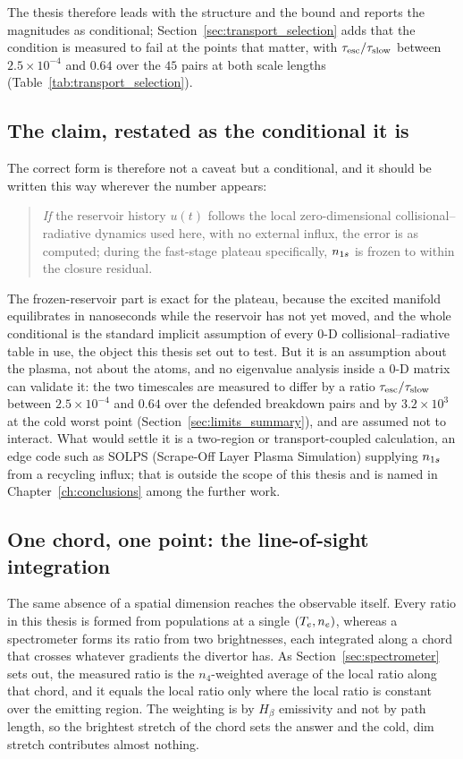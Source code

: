 The thesis therefore leads with the structure and the bound and reports the
magnitudes as conditional; Section~\ref{sec:transport_selection} adds that the
condition is measured to fail at the points that matter, with
$\tau_{\mathrm{esc}}/\tau_{\mathrm{slow}}$ between $2.5\times10^{-4}$ and $0.64$ over the $45$ pairs at
both scale lengths (Table~\ref{tab:transport_selection}).

\subsection{The claim, restated as the conditional it is}

The correct form is therefore not a caveat but a conditional, and it should be
written this way wherever the number appears:

\begin{quote}
\emph{If} the reservoir history $u(t)$ follows the local zero-dimensional
collisional--radiative dynamics used here, with no external influx, the error
is as computed; during the fast-stage plateau specifically, $n_{1s}$ is frozen to
within the closure residual.
\end{quote}

The frozen-reservoir part is exact for the plateau, because the excited manifold
equilibrates in nanoseconds while the reservoir has not yet moved, and the whole
conditional is the standard implicit assumption of every
$0$-D collisional--radiative table in use, the object this thesis set out to
test. But it is an assumption about the plasma, not about the atoms, and no
eigenvalue analysis inside a $0$-D matrix can validate it: the two timescales
are measured to differ by a ratio $\tau_{\mathrm{esc}}/\tau_{\mathrm{slow}}$ between $2.5\times10^{-4}$ and $0.64$ over the
defended breakdown pairs and by $3.2\times10^{3}$ at the cold worst point
(Section~\ref{sec:limits_summary}), and are assumed not to interact.
What would settle it is a two-region or transport-coupled calculation, an edge
code such as SOLPS (Scrape-Off Layer Plasma Simulation) supplying $n_{1s}$ from a
recycling influx; that is outside the scope of this thesis and is named in
Chapter~\ref{ch:conclusions} among the further work.

\subsection{One chord, one point: the line-of-sight integration}
\label{sec:los_limitation}

The same absence of a spatial dimension reaches the observable itself. Every
ratio in this thesis is formed from populations at a single $(T_e,n_e)$,
whereas a spectrometer forms its ratio from two brightnesses, each integrated
along a chord that crosses whatever gradients the divertor has. As
Section~\ref{sec:spectrometer} sets out, the measured ratio is the
$n_4$-weighted average of the local ratio along that chord, and it equals the
local ratio only where the local ratio is constant over the emitting region.
The weighting is by $H_\beta$ emissivity and not by path length, so the
brightest stretch of the chord sets the answer and the cold, dim stretch
contributes almost nothing.

